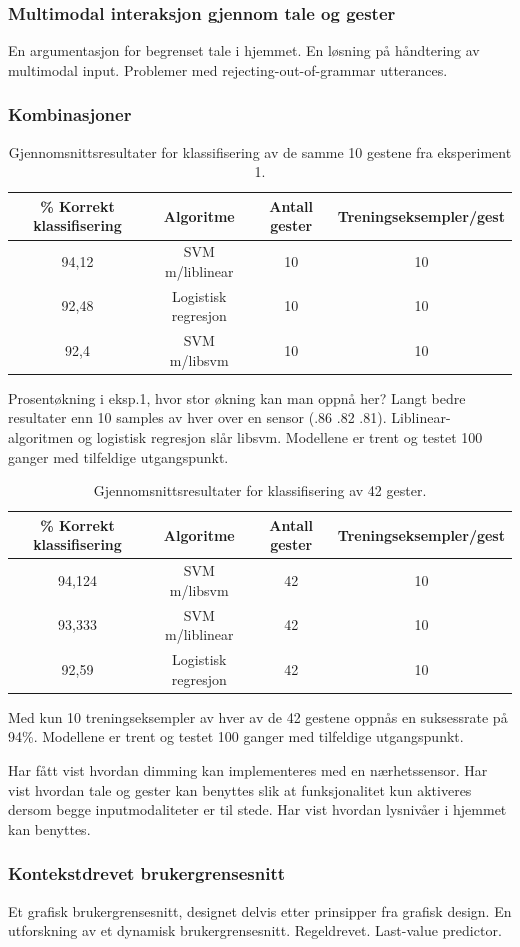 \subsubsection*{Multimodal interaksjon gjennom tale og gester}
{\color{blue}En argumentasjon for begrenset tale i hjemmet. En løsning på håndtering av multimodal input. Problemer med rejecting-out-of-grammar utterances.}

\subsubsection*{Kombinasjoner}
\begin{table}[h!]
\centering
\begin{tabular}{|| c c c c ||}
\hline
\% Korrekt klassifisering & Algoritme & Antall gester & Treningseksempler/gest \\ [0.5ex] 
 \hline\hline
 94,12 & SVM m/liblinear & 10 & 10 \\ 
 \hline
 92,48 & Logistisk regresjon & 10 & 10 \\ [1ex]
 \hline
 92,4 & SVM m/libsvm & 10 & 10 \\
 \hline
\end{tabular}
\caption{Gjennomsnittsresultater for klassifisering av de samme 10 gestene fra eksperiment 1.}
\label{table:results-foursensors}
\end{table}
{\color{blue}Prosentøkning i eksp.1, hvor stor økning kan man oppnå her?
Langt bedre resultater enn 10 samples av hver over en sensor (.86 .82 .81). Liblinear-algoritmen og logistisk regresjon slår libsvm.  Modellene er trent og testet 100 ganger med tilfeldige utgangspunkt.}
\begin{table}[h!]
\centering
\begin{tabular}{|| c c c c ||}
\hline
\% Korrekt klassifisering & Algoritme & Antall gester & Treningseksempler/gest\\ [0.5ex] 
 \hline\hline
 94,124 & SVM m/libsvm & 42 & 10 \\ 
 \hline
 93,333 & SVM m/liblinear & 42 & 10 \\
 \hline
 92,59 & Logistisk regresjon & 42 & 10 \\ [1ex]
 \hline
\end{tabular}
\caption{Gjennomsnittsresultater for klassifisering av 42 gester.}
\label{table:results-foursensors}
\end{table}
Med kun 10 treningseksempler av hver av de 42 gestene oppnås en suksessrate på 94\%. Modellene er trent og testet 100 ganger med tilfeldige utgangspunkt.

Har fått vist hvordan dimming kan implementeres med en nærhetssensor. Har vist hvordan tale og gester kan benyttes slik at funksjonalitet kun aktiveres dersom begge inputmodaliteter er til stede. Har vist hvordan lysnivåer i hjemmet kan benyttes. 

\subsubsection*{Kontekstdrevet brukergrensesnitt}
Et grafisk brukergrensesnitt, designet delvis etter prinsipper fra grafisk design. En utforskning av et dynamisk brukergrensesnitt. Regeldrevet. Last-value predictor.